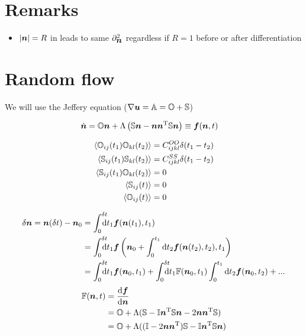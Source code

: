 \documentclass[thesis.tex]{subfiles}
\begin{document}
\section{Remarks}
\begin{itemize}
	\item $|\mbox{\boldmath$n$}|=R$ in  leads to same $\partial^2_{\mbox{\boldmath$n$}}$ regardless if $R=1$ before or after differentiation
\end{itemize}
\section{Random flow}

We will use the Jeffery equation ($\nabla \mbox{\boldmath$u$} = \mathbb{A} = \mathbb{O} + \mathbb{S}$)

\begin{align*}
	\dot{\mbox{\boldmath$n$}} &= \mathbb{O} \mbox{\boldmath$n$} + \Lambda\left(\mathbb{S} \mbox{\boldmath$n$} - \mbox{\boldmath$n$} \mbox{\boldmath$n$}^{\mathrm T}\mathbb{S} \mbox{\boldmath$n$}\right)	\equiv \mbox{\boldmath$f$}(\mbox{\boldmath$n$}, t)
\end{align*}


\begin{align*}
	\left \langle \mathbb{O}_{ij}(t_1)\mathbb{O}_{kl}(t_2)\right \rangle &= C^{OO}_{ijkl}\delta(t_1-t_2) \\
	\left \langle \mathbb{S}_{ij}(t_1)\mathbb{S}_{kl}(t_2)\right \rangle &= C^{SS}_{ijkl}\delta(t_1-t_2) \\
	\left \langle \mathbb{S}_{ij}(t_1)\mathbb{O}_{kl}(t_2)\right \rangle &= 0 \\
	\left \langle \mathbb{S}_{ij}(t)\right \rangle &= 0 \\
	\left \langle \mathbb{O}_{ij}(t)\right \rangle &= 0
\end{align*}


\begin{align*}
	\delta \ve n = \ve n(\delta t) - \ve n_0 &= \int_0^{\delta t}\!\!\!\!\!\rd t_1 \ve f (\ve n(t_1 ), t_1)\\
	&= \int_0^{\delta t}\!\!\!\!\!\rd t_1 \ve f\left(\ve n_0 + \int_0^{t_1}\rd t_2 \ve f(\ve n(t_2),t_2), t_1\right)\\
	&= \int_0^{\delta t}\!\!\!\!\!\rd t_1 \ve f (\ve n_0, t_1)+\int_0^{\delta t}\!\!\!\!\!\rd t_1 \ma F (\ve n_0, t_1)\int_0^{t_1}\rd t_2 \ve f(\ve n_0, t_2) + ...
\end{align*}
\begin{align*}
	\mathbb{F}(\mbox{\boldmath$n$}, t) &= \frac{\mathrm{d} \mbox{\boldmath$f$}}{\mathrm{d} \mbox{\boldmath$n$}} \\
	&= \mathbb{O} + \Lambda(\mathbb{S} - \mathbb{I} \mbox{\boldmath$n$}^{\mathrm T} \mathbb{S} \mbox{\boldmath$n$} - 2\mbox{\boldmath$n$}\mbox{\boldmath$n$}^{\mathrm T} \mathbb{S}) \\
	& = \mathbb{O} + \Lambda( (\mathbb{I} - 2\mbox{\boldmath$n$} \mbox{\boldmath$n$}^{\mathrm T})\mathbb{S} - \mathbb{I} \mbox{\boldmath$n$}^{\mathrm T} \mathbb{S} \mbox{\boldmath$n$} )
\end{align*}
\end{document}
